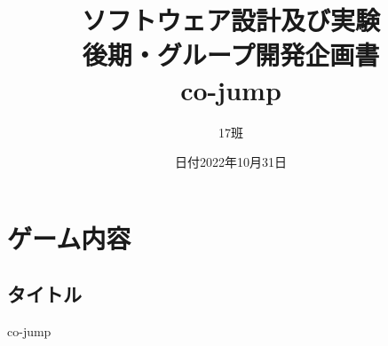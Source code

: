 \documentclass{jsarticle}
\title{ソフトウェア設計及び実験\\後期・グループ開発企画書\\
	\huge{co-jump}
}
\author{17班}
\date{日付2022年10月31日}
\begin{document}
\maketitle

\section{ゲーム内容}

\subsection{タイトル}
co-jump
\end{document}
